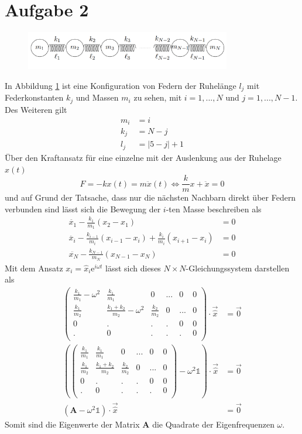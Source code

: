 \section*{Aufgabe 2}

\begin{figure}[h!]
\centering
\includegraphics[width=0.8\textwidth]{content/images/Federn.png}
\label{fig:federn}
\end{figure}

\noindent In Abbildung \ref{fig:federn} ist eine Konfiguration von Federn der Ruhelänge $l_j$ mit Federkonstanten $k_j$ und Massen $m_i$ zu sehen, mit $i=1,...,N$ und $j = 1,...,N-1$. Des Weiteren gilt
\begin{align*}
m_i &= i\\
k_j &= N - j\\
l_j &= |5 - j| + 1
\end{align*}
Über den Kraftansatz für eine einzelne mit der Auslenkung aus der Ruhelage $x(t)$
\[
F = -kx(t) = m \ddot{x}(t) \Leftrightarrow {\frac{k}{m}}x + \ddot{x} = 0
\]
und auf Grund der Tatsache, dass nur die nächsten Nachbarn direkt über Federn verbunden sind lässt sich die Bewegung der $i$-ten Masse beschreiben als
\begin{align*}
\ddot{x_1} - \frac{k_1}{m_1}(x_2-x_1) &= 0\\
\ddot{x_i} - \frac{k_{i-1}}{m_i}(x_{i-1}-x_i)+\frac{k_i}{m_i}(x_{i+1}-x_i) &= 0\\
\ddot{x_N} - \frac{k_{N-1}}{m_N}(x_{N-1}-x_N) &= 0
\end{align*}
Mit dem Ansatz $x_i = \hat{x}_i\mathrm{e}^{i\omega t}$ lässt sich dieses $N\times N$-Gleichungssystem darstellen als
\begin{align*}
\begin{pmatrix}
\frac{k_1}{m_1}-\omega^2 & \frac{k_1}{m_1} & 0 & ... & 0 & 0\\
\frac{k_1}{m_2} & \frac{k_1+k_2}{m_2}- \omega^2 & \frac{k_2}{m_2} & 0 & ... & 0\\
0 & . & . & . & 0 & 0\\
. & 0 & . & . & . & 0\\
\end{pmatrix}\cdot\vec{\hat{x}} &= \vec{0}\\
\left(\begin{pmatrix}
\frac{k_1}{m_1} & \frac{k_1}{m_1} & 0 & ... & 0 & 0\\
\frac{k_1}{m_2} & \frac{k_1+k_2}{m_2} & \frac{k_2}{m_2} & 0 & ... & 0\\
0 & . & . & . & 0 & 0\\
. & 0 & . & . & . & 0\\
\end{pmatrix} - \omega^2\mathds{1}\right) \cdot\vec{\hat{x}} &= \vec{0}\\
\left(\mathbf{A}- \omega^2\mathds{1}\right) \cdot\vec{\hat{x}} &= \vec{0}
\end{align*}
Somit sind die Eigenwerte der Matrix $\mathbf{A}$ die Quadrate der Eigenfrequenzen $\omega$.

